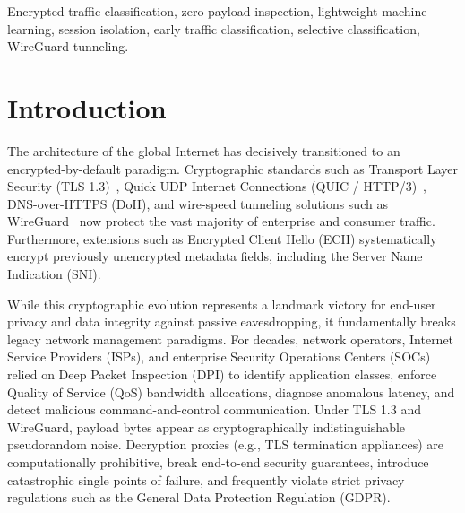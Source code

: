 \documentclass[conference]{IEEEtran}
\begin{document}
\begin{abstract}
early triage at 3 packets achieves 0.6111 Macro-F1 in 79.94~ms, while retrospective full-flow analysis requires $\approx 59.7$~seconds and completely fails; and (5) A validation-calibrated selective abstention policy ($\tau^* = 0.70$) monotonically reduces error among accepted test flows from 45.83\% down to 26.92\% at 54.17\% flow coverage. We provide an exhaustive discussion of operational boundaries, closed-world limitations, and a fully verifiable artifact package.
\end{abstract}

\begin{IEEEkeywords}
Encrypted traffic classification, zero-payload inspection, lightweight machine learning, session isolation, early traffic classification, selective classification, WireGuard tunneling.
\end{IEEEkeywords}

\section{Introduction}
\label{sec:intro}

The architecture of the global Internet has decisively transitioned to an encrypted-by-default paradigm. Cryptographic standards such as Transport Layer Security (TLS 1.3)~\cite{rescorla2018tls}, Quick UDP Internet Connections (QUIC / HTTP/3)~\cite{iyengar2021quic}, DNS-over-HTTPS (DoH), and wire-speed tunneling solutions such as WireGuard~\cite{donenfeld2017wireguard} now protect the vast majority of enterprise and consumer traffic. Furthermore, extensions such as Encrypted Client Hello (ECH) systematically encrypt previously unencrypted metadata fields, including the Server Name Indication (SNI).

While this cryptographic evolution represents a landmark victory for end-user privacy and data integrity against passive eavesdropping, it fundamentally breaks legacy network management paradigms. For decades, network operators, Internet Service Providers (ISPs), and enterprise Security Operations Centers (SOCs) relied on Deep Packet Inspection (DPI) to identify application classes, enforce Quality of Service (QoS) bandwidth allocations, diagnose anomalous latency, and detect malicious command-and-control communication. Under TLS 1.3 and WireGuard, payload bytes appear as cryptographically indistinguishable pseudorandom noise. Decryption proxies (e.g., TLS termination appliances) are computationally prohibitive, break end-to-end security guarantees, introduce catastrophic single points of failure, and frequently violate strict privacy regulations such as the General Data Protection Regulation (GDPR).
\end{document}
